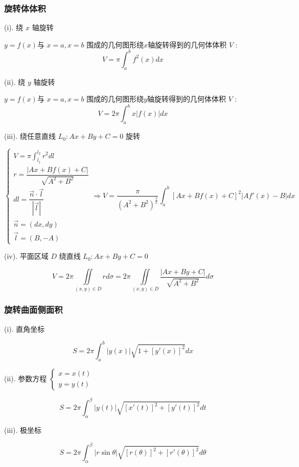 \subsubsection{旋转体体积}
\begin{theorem}[旋转体体积]

	(i). 绕 $x$ 轴旋转

	$y=f(x)$与 $x=a,x=b$ 围成的几何图形绕$x$轴旋转得到的几何体体积 $V$ :
	$$V=\pi\int_{a}^{b}f^{2}(x)dx$$

	(ii). 绕 $y$ 轴旋转

	$y=f(x)$与 $x=a,x=b$ 围成的几何图形绕$y$轴旋转得到的几何体体积 $V$ :
	$$V=2\pi\int_{a}^{b}x|f(x)|dx$$

	(iii). 绕任意直线 $L_{0}: Ax+By+C=0$ 旋转

	$$\begin{cases} V=\pi\int_{l_{1}}^{l_{2}}r^{2}dl \\ 
		r = \dfrac{|Ax+Bf(x)+C|}{\sqrt{A^{2}+B^{2}}}\\
		dl = \dfrac{\vec{n}\cdot \vec{l}}{|\vec{l}|}\\
		\vec{n} = (dx,dy)\\
		\vec{l} = (B,-A)
	\end{cases}\Rightarrow V = \dfrac{\pi}{(A^{2}+B^{2})^{\frac{3}{2}}}\int_{a}^{b} \left[Ax+Bf(x)+C\right]^{2}\big|Af'(x)-B\big|dx$$

	(iv). 平面区域 $D$ 绕直线 $L_{0}: Ax+By+C=0$

	$$V = 2\pi\iint\limits_{(x,y)\in D} rd\sigma = 2\pi\iint\limits_{(x,y)\in D} \dfrac{|Ax+By+C|}{\sqrt{A^{2}+B^{2}}}d\sigma$$
\end{theorem}
\subsubsection{旋转曲面侧面积}
\begin{theorem}

	(i). 直角坐标

	$$S = 2\pi\int_{a}^{b}|y(x)|\sqrt{1+[y'(x)]^{2}}dx$$

	(ii). 参数方程 $\left\lbrace
		\begin{array}{l}
			x=x(t) \\
			y=y(t)
		\end{array}
		\right. $

	$$S = 2\pi\int_{\alpha}^{\beta}|y(t)|\sqrt{[x'(t)]^{2}+[y'(t)]^{2}}dt$$

	(iii). 极坐标

	$$S = 2\pi \int_{\alpha}^{\beta}|r\sin\theta|\sqrt{[r(\theta)]^{2}+[r'(\theta)]^{2}}d\theta$$
\end{theorem}
